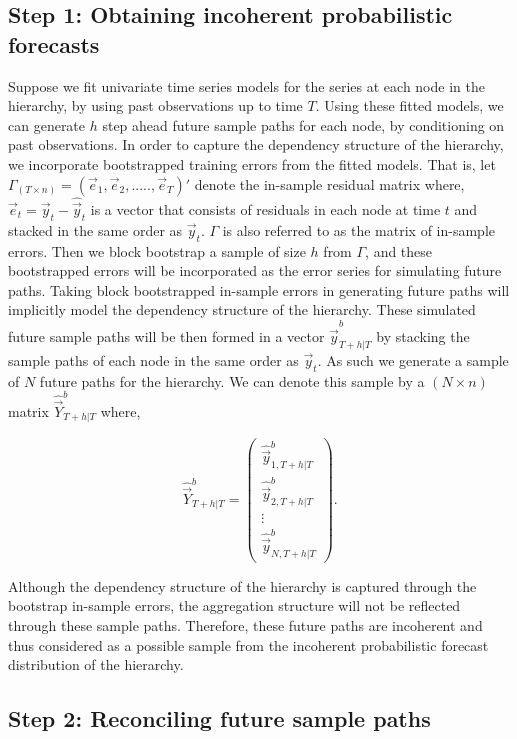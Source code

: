 \documentclass[graybox]{svmult}
\begin{document}
\subsection*{Step 1: Obtaining incoherent probabilistic forecasts}

Suppose we fit univariate time series models for the series at each node in the hierarchy, by using past observations up to time $T$. Using these fitted models, we can generate $h$ step ahead future sample paths for each node, by conditioning on past observations. In order to capture the dependency structure of the hierarchy, we incorporate bootstrapped training errors from the fitted models. That is, let $\varGamma_{(T \times n)}=(\vec{e}_1,\vec{e}_2,.....,\vec{e}_T)'$ denote the in-sample residual matrix where, $\vec{e}_t=\vec{y}_t-\hat{\vec{y}}_t$ is a vector that consists of residuals in each node at time $t$ and stacked in the same order as $\vec{y}_t$. $\varGamma$ is also referred to as the matrix of in-sample errors. Then we block bootstrap a sample of size $h$ from $\varGamma$, and these bootstrapped errors will be incorporated as the error series for simulating future paths. Taking block bootstrapped in-sample errors in generating future paths will implicitly model the dependency structure of the hierarchy. These simulated future sample paths will be then formed in a vector $\hat{\vec{y}}_{T+h|T}^b$ by stacking the sample paths of each node in the same order as $\vec{y}_t$. As such we generate a sample of $N$ future paths for the hierarchy. We can denote this sample by a $(N \times n)$ matrix $\hat{\vec{Y}}^b_{T+h|T}$ where,

\begin{equation} \label{eq:19}
\hat{\vec{Y}}^b_{T+h|T}=\begin{pmatrix}
\hat{\vec{y}}_{1,T+h|T}^b\\
\hat{\vec{y}}_{2,T+h|T}^b\\
\vdots\\
\hat{\vec{y}}_{N,T+h|T}^b
\end{pmatrix}.
\end{equation}

Although the dependency structure of the hierarchy is captured through the bootstrap in-sample errors, the aggregation structure will not be reflected through these sample paths. Therefore, these future paths are incoherent and thus considered as a possible sample from the incoherent probabilistic forecast distribution of the hierarchy.

\subsection*{Step 2: Reconciling future sample paths}
\end{document}
